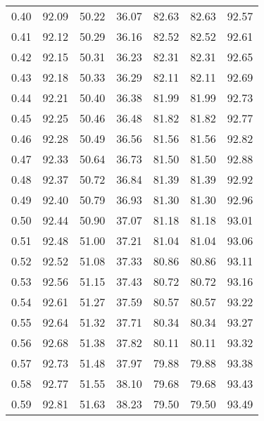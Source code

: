 \begin{tabular}{|c|c|c|c|c|c|c|}
      0.40 &     92.09 &     50.22 &      36.07 &   82.63 &      82.63 &         92.57 \\
      0.41 &     92.12 &     50.29 &      36.16 &   82.52 &      82.52 &         92.61 \\
      0.42 &     92.15 &     50.31 &      36.23 &   82.31 &      82.31 &         92.65 \\
      0.43 &     92.18 &     50.33 &      36.29 &   82.11 &      82.11 &         92.69 \\
      0.44 &     92.21 &     50.40 &      36.38 &   81.99 &      81.99 &         92.73 \\
      0.45 &     92.25 &     50.46 &      36.48 &   81.82 &      81.82 &         92.77 \\
      0.46 &     92.28 &     50.49 &      36.56 &   81.56 &      81.56 &         92.82 \\
      0.47 &     92.33 &     50.64 &      36.73 &   81.50 &      81.50 &         92.88 \\
      0.48 &     92.37 &     50.72 &      36.84 &   81.39 &      81.39 &         92.92 \\
      0.49 &     92.40 &     50.79 &      36.93 &   81.30 &      81.30 &         92.96 \\
      0.50 &     92.44 &     50.90 &      37.07 &   81.18 &      81.18 &         93.01 \\
      0.51 &     92.48 &     51.00 &      37.21 &   81.04 &      81.04 &         93.06 \\
      0.52 &     92.52 &     51.08 &      37.33 &   80.86 &      80.86 &         93.11 \\
      0.53 &     92.56 &     51.15 &      37.43 &   80.72 &      80.72 &         93.16 \\
      0.54 &     92.61 &     51.27 &      37.59 &   80.57 &      80.57 &         93.22 \\
      0.55 &     92.64 &     51.32 &      37.71 &   80.34 &      80.34 &         93.27 \\
      0.56 &     92.68 &     51.38 &      37.82 &   80.11 &      80.11 &         93.32 \\
      0.57 &     92.73 &     51.48 &      37.97 &   79.88 &      79.88 &         93.38 \\
      0.58 &     92.77 &     51.55 &      38.10 &   79.68 &      79.68 &         93.43 \\
      0.59 &     92.81 &     51.63 &      38.23 &   79.50 &      79.50 &         93.49 \\

\end{tabular}
